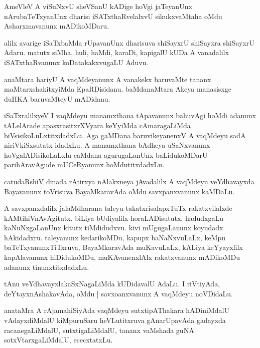 \documentclass{article}
\begin{document}
\begin{mn}%
AmeVleV A viSuNxvU sheVSanU kADige hoVgi jaTeyanUnx nArubaTeTxyanUnx dharisi 
iSATxthaRvelalxvU sikukxvaMtaha oMdu Asharxmavanunx mADikoMDaru.
\end{mn}

\begin{mn}%
alilx avarige iSaTxbaMda rUpavanUnx dharisuva shiSayxrU shiSayxra shiSayxrU Adaru. matutx 
siMha, huli, haMdi, karaDi, kapigalU kUDa A vanadalilx iSATxthaRvanunx koDatakakxvugaLU 
Aduvu.
\end{mn}

\begin{mn}%
anaMtara hariyU A vaqMdeyanunx A vanakekx baruvaMte tananx maMtarxshakitxyiMda EpaRDisidanu. 
baMdanaMtara Akeya manasisxge duHKA baruvaMteyU mADidanu.
\end{mn}

\begin{mn}%
iSaTxralilxyeV I vaqMdeyu manamxthana tApavanunx bahuvAgi hoMdi adanunx tALelArade 
apasxrasitxrXVyara keYyiMda cAmaragaLiMda biVsisikoLuLxtitxdadxLu. Aga gaMDana 
baruvikeyanenxV A vaqMdeyu sadA niriVkiSxsutatx idadxLu. A manamxthana bAdheya uSaNxvanunx 
hoVgalADisikoLaLxlu caMdana agurugaLanUnx baLidukoMDarU parihAravAgude mUCeRyanunx 
hoMdutitxdadxLu.
\end{mn}

\begin{mn}%
catudaRshiV dinada rAtirxya nAlakxneya jAvadalilx A vaqMdeyu veYdhavayxda Bayavanunx 
toVrisuva BayaMkaravAda oMdu savxpanxvanunx kaMDaLu.
\end{mn}

\begin{mn}%
A savxpanxdalilx jalaMdharana taleyu takatxrisalapxTuTx rakatxvilalxde kAMtihiVnAvAgitutx. 
biLiya bUdiyalilx horaLADisututx. hadudxgaLu kaNuNxgaLanUnx kitutx tiMdidudxvu. kivi 
mUgugaLanunx koyudadx hAkidadxru. taleyanunx kedarikoMDu, kapupx baNaNxvuLaLx, keMpu 
baTeTxyanunxTiTxruva, BayaMkaravAda muKavuLaLx, kALiya keYyayxlilx kapAlavanunx 
hiDidukoMDu, muKAvanenxlAlx rakatxvanunx mADikoMDu adanunx tinunxtitxdadxLu.
\end{mn}

\begin{mn}%
tAnu veYdhavayxlakaSxNagaLiMda kUDidavalU AdaLu. I riVtiyAda, deYtayxnAshakavAda, oMdu ]
savxoanxvanunx A vaqMdeyu noVDidaLu.
\end{mn}

\begin{mn}%
anataMra A rAjamahiSiyAda vaqMdeyu sutxtipAThakara hADiniMdalU vAdayxdiMdalU kiMpuruSaru 
heVLutitxruva gAnarUpavAda gadayxda racanegaLiMdalU, sutxtigaLiMdalU, tananx vaMshada guNA 
sotxVtarxgaLiMdalU, ececxtatxLu.
\end{mn}
\end{document}
